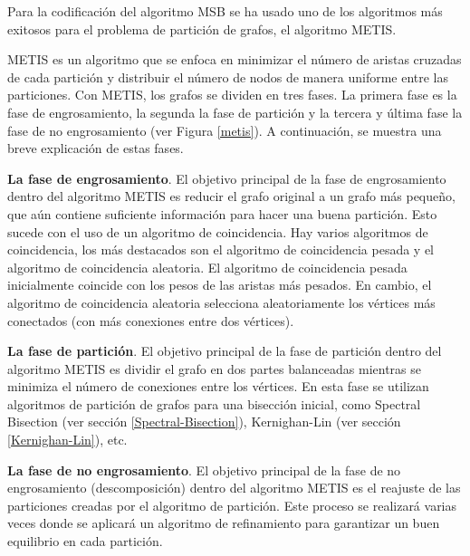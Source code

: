 Para la codificación del algoritmo MSB se ha usado uno de los algoritmos más exitosos para el problema de partición de grafos, el algoritmo METIS.

METIS\cite{MeTis} es un algoritmo que se enfoca en minimizar el número de aristas cruzadas de cada partición y distribuir el número de nodos de manera uniforme entre las particiones. Con METIS, los grafos se dividen en tres fases. La primera fase es la fase de engrosamiento, la segunda la fase de partición y la tercera y última fase la fase de no engrosamiento (ver Figura \ref{metis}). A continuación, se muestra una breve explicación de estas fases.

\textbf{La fase de engrosamiento}. El objetivo principal de la fase de engrosamiento dentro del algoritmo METIS es reducir el grafo original a un grafo más pequeño, que aún contiene suficiente información para hacer una buena partición. Esto sucede con el uso de un algoritmo de coincidencia. Hay varios algoritmos de coincidencia, los más destacados son el algoritmo de coincidencia pesada y el algoritmo de coincidencia aleatoria. El algoritmo de coincidencia pesada inicialmente coincide con los pesos de las aristas más pesados. En cambio, el algoritmo de coincidencia aleatoria selecciona aleatoriamente los vértices más conectados (con más conexiones entre dos vértices). 

\textbf{La fase de partición}. El objetivo principal de la fase de partición dentro del algoritmo METIS es dividir el grafo en dos partes balanceadas mientras se minimiza el número de conexiones entre los vértices. En esta fase se utilizan algoritmos de partición de grafos para una bisección inicial, como Spectral Bisection (ver sección \ref{Spectral-Bisection}), Kernighan-Lin (ver sección \ref{Kernighan-Lin}), etc.  

\textbf{La fase de no engrosamiento}. El objetivo principal de la fase de no engrosamiento (descomposición) dentro del algoritmo METIS es el reajuste de las particiones creadas por el algoritmo de partición. Este proceso se realizará varias veces donde se aplicará un algoritmo de refinamiento para garantizar un buen equilibrio en cada partición.

